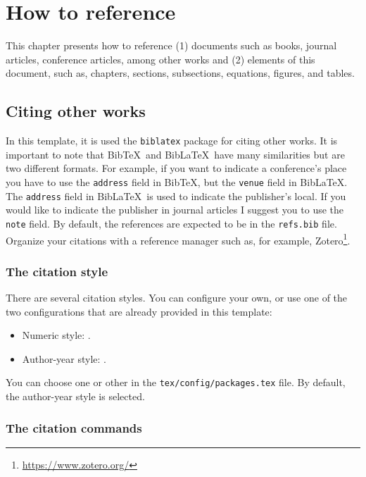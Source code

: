 \chapter{How to reference}
\label{ch:how-to-reference}

This chapter presents how to reference (1) documents such as books, journal articles, conference articles, among other works and (2) elements of this document, such as, chapters, sections, subsections, equations, figures, and tables.

\section{Citing other works}
\label{sec:citing-other-works}

In this template, it is used the \verb+biblatex+ package for citing other works. It is important to note that Bib\TeX\ and Bib\LaTeX\ have many similarities but are two different formats. For example, if you want to indicate a conference's place you have to use the \verb+address+ field in Bib\TeX, but the \verb+venue+ field in Bib\LaTeX. The \verb+address+ field in Bib\LaTeX\ is used to indicate the publisher's local. If you would like to indicate the publisher in journal articles I suggest you to use the \verb+note+ field. By default, the references are expected to be in the \verb+refs.bib+ file. Organize your citations with a reference manager such as, for example, Zotero\footnote{\url{https://www.zotero.org/}}.

\subsection{The citation style}
\label{ssec:the-citation-style}

There are several citation styles. You can configure your own, or use one of the two configurations that are already provided in this template:

\begin{itemize}
\item
Numeric style: \verb++.
\item
Author-year style: \verb++.
\end{itemize}

You can choose one or other in the \verb+tex/config/packages.tex+ file. By default, the author-year style is selected.

\subsection{The citation commands}
\label{ssec:the-citation-commands}

